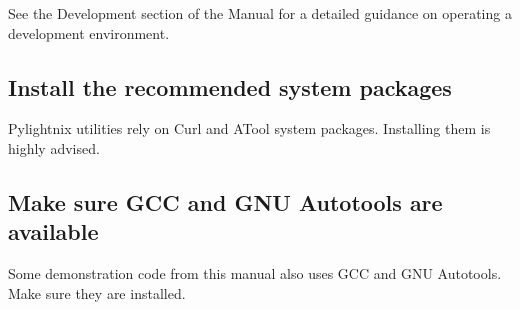 See the Development section of the Manual for a detailed guidance on operating a
development environment.

\subsection{Install the recommended system packages}

Pylightnix utilities rely on Curl and ATool system packages. Installing them
is highly advised.


\subsection{Make sure GCC and GNU Autotools are available}

Some demonstration code from this manual also uses GCC and GNU Autotools. Make
sure they are installed.


